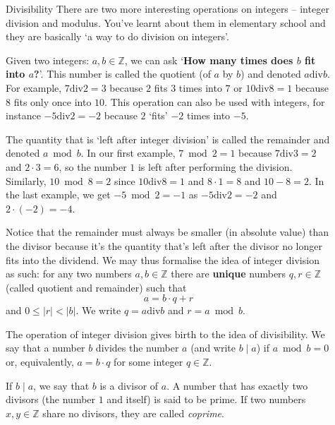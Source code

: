 \documentclass[final]{beamer}
\newlength{\sepwidth}
\newlength{\colwidth}
\newcommand{\separatorcolumn}{\begin{column}{\sepwidth}\end{column}}
\newcommand{\Z}{\mathbb{Z}}
\newcommand{\dv}{\mathbin{\mathrm{div}}}
\begin{document}
\begin{frame}[t]
\begin{columns}[t]
\begin{column}{\colwidth}
\begin{alertblock}{Divisibility}
 There are two more interesting operations on integers -- \alert{integer
 division} and \alert{modulus}. You've learnt about them in elementary school
 and they are basically `a way to do \alert{division on integers}'.

 Given two integers: $a,b \in \Z$, we can ask `\textbf{How many times does $b$
 fit into $a$?}'. This number is called the \alert{quotient} (of $a$ by $b$) and
 denoted \alert{$a \dv b$}. For example, $7 \dv 2 = 3$ because $2$ fits $3$
 times into $7$ or $10 \dv 8 = 1$ because $8$ fits only once into $10$. This
 operation can also be used with integers, for instance $-5 \dv 2 = -2$ because
 $2$ `fits' $-2$ times into $-5$.

 The quantity that is `left after integer division' is called the
 \alert{remainder} and denoted $a \bmod b$. In our first example, $7 \bmod 2 =
 1$ because $7 \dv 3 = 2$ and $2 \cdot 3 = 6$, so the number $1$ is left after
 performing the division. Similarly, $10 \bmod 8 = 2$ since $10 \dv 8 = 1$ and
 $8 \cdot 1 = 8$ and $10 - 8 = 2$. In the last example, we get $-5 \bmod 2 = -1$
 as $-5 \dv 2 = -2$ and $2 \cdot (-2) = -4$.

 Notice that the \alert{remainder must always be smaller (in absolute value)
 than the divisor} because it's the quantity that's left after the divisor no
 longer fits into the dividend. We may thus formalise the idea of \alert{integer
 division as such}: for any two numbers $a,b \in \Z$ there are \textbf{unique}
 numbers $q,r \in \Z$ (called \alert{quotient} and \alert{remainder}) such that
 \[
  a = b \cdot q + r
 \]
 and $0 \leq |r| < |b|$. We write $q = a \dv b$ and $r = a \bmod b$.

 The operation of integer division gives birth to the idea of
 \alert{divisibility}. We say that a number $b$ \alert{divides} the number $a$
 (and write $b \mid a$) if $a \bmod b = 0$ or, equivalently, $a = b \cdot q$ for
 some integer $q \in \Z$. 

 If $b \mid a$, we say that $b$ is a \alert{divisor} of $a$. A number that
 \alert{has exactly two divisors} (the number $1$ and itself) is said to be
 \alert{prime}. If two numbers $x,y \in \Z$ \alert{share no divisors}, they are
 called \emph{coprime}.
\end{alertblock}

\end{column}
\separatorcolumn

\begin{column}{\colwidth}


\end{column}
\end{columns}
\end{frame}
\end{document}
